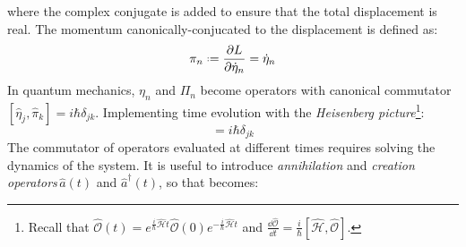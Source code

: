 where the complex conjugate is added to ensure that the total displacement is real. The momentum canonically-conjucated to the displacement is defined as:
\begin{equation}
  \pi_n \defeq \frac{\pa L}{\pa \dot{\eta}_n} = \dot{\eta}_n
\end{equation}
In quantum mechanics, $ \eta_n $ and $ \Pi_n $ become operators with canonical commutator $ [ \hat{\eta}_j, \hat{\pi}_k ] = i \hbar \delta_{jk} $. Implementing time evolution with the \textit{Heisenberg picture}\footnote{Recall that $ \hat{\mathcal{O}}(t) = e^{\frac{i}{\hbar} \hat{\mathcal{H}} t} \hat{\mathcal{O}}(0) e^{-\frac{i}{\hbar} \hat{\mathcal{H}} t} $ and $ \frac{\dd \hat{\mathcal{O}}}{\dd t} = \frac{i}{\hbar} [ \hat{\mathcal{H}}, \hat{\mathcal{O}} ] $.}:
\begin{equation}
  [ \hat{\eta}_j(t), \hat{\pi}_k(t) ] = i \hbar \delta_{jk}
  \label{eq:first-comm}
\end{equation}
The commutator of operators evaluated at different times requires solving the dynamics of the system. It is useful to introduce \textit{annihilation} and \textit{creation operators}\footnotemark $\, \hat{a}(t) $ and $ \hat{a}^\dagger(t) $, so that  becomes:



